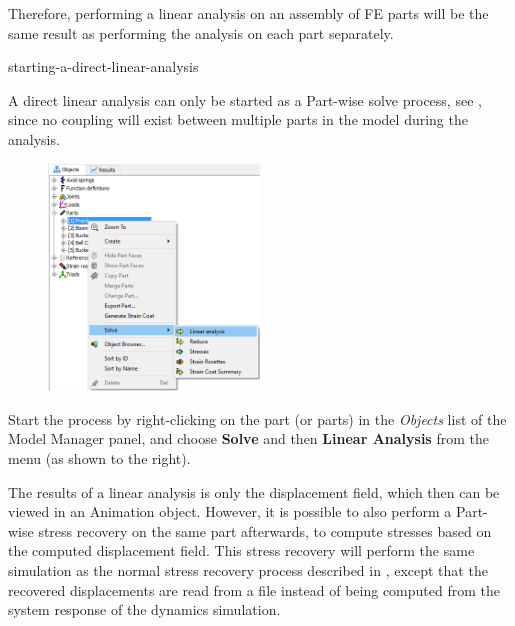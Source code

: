 {Therefore, performing a linear analysis on an assembly of FE parts will be the
same result as performing the analysis on each part separately.


           {starting-a-direct-linear-analysis}

A direct linear analysis can only be started as a Part-wise solve process, see
, since
no coupling will exist between multiple parts in the model during the analysis.

\begin{figure}
  \includegraphics[width=0.5\textwidth]{Figures/6-SolveLinearAnalysis.png}
\end{figure}

Start the process by right-clicking on the part (or parts) in the {\sl Objects}
list of the Model Manager panel, and choose \textbf{Solve} and then
\textbf{Linear Analysis} from the menu (as shown to the right).

The results of a linear analysis is only the displacement field, which then can
be viewed in an Animation object. However, it is possible to also perform
a Part-wise stress recovery on the same part afterwards, to compute stresses
based on the computed displacement field. This stress recovery will perform the
same simulation as the normal stress recovery process described in
,
except that the recovered displacements are read from a file instead of being
computed from the system response of the dynamics simulation.




}
